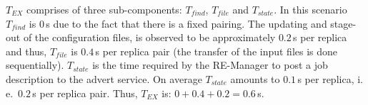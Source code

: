 \documentclass{rspublic}
\newcommand{\jhanote}[1]{ {\textcolor{red} { ***shantenu: #1 }}}
\newcommand{\alnote}[1]{ {\textcolor{blue} { ***andre: #1 }}}
\newcommand{\athotanote}[1]{ {\textcolor{green} { ***athota: #1 }}}
\newcommand{\alnote}[1]{}
\newcommand{\athotanote}[1]{}
\newcommand{\jhanote}[1]{}
\begin{document}









$T_{EX}$ comprises of three sub-components: $T_{find}$, $T_{file}$ and
$T_{state}$. In this scenario $T_{find}$ is $0$\,s due to the fact that there
is a fixed pairing. The updating and stage-out of the configuration
files, is observed to be approximately $0.2$\,s per replica and thus,
$T_{file}$ is $0.4$\,s per replica pair (the transfer of the input files is
done sequentially). 
$T_{state}$ is the time required by the RE-Manager to post a job
description to the advert service. On average $T_{state}$ amounts to
$0.1$\,s per replica, i.\,e.\ $0.2$\,s per replica pair.
Thus, $T_{EX}$ is: $0+0.4+0.2=0.6$\,s. 
\end{document}
